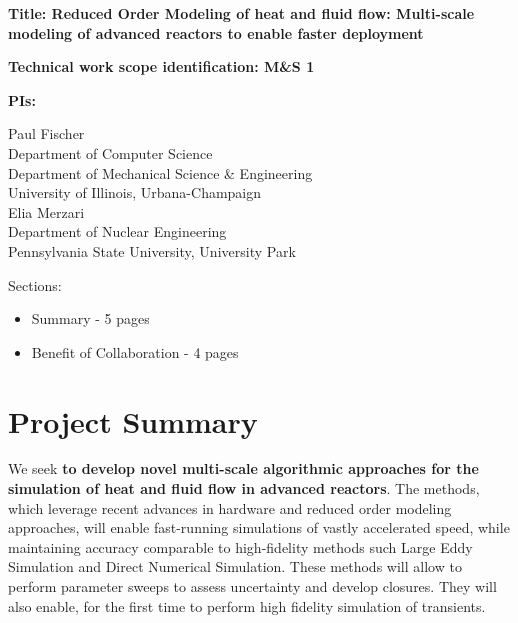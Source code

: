 
\parindent 0in
\parskip 0.1in

{\bf Title:  Reduced Order Modeling of heat and fluid flow: Multi-scale modeling of advanced reactors to enable faster deployment }

{\bf Technical work scope identification: M\&S 1 }

{\bf PIs:}

Paul Fischer \\
Department of Computer Science \\
Department of Mechanical Science \& Engineering \\
University of Illinois, Urbana-Champaign \\

Elia Merzari \\
Department of Nuclear Engineering \\
Pennsylvania State University, University Park

Sections:
\begin{itemize}
\item{Summary - 5 pages}
\item{Benefit of Collaboration - 4 pages}
\end{itemize}



\section{Project Summary}


We seek \textbf{to develop novel multi-scale algorithmic approaches for the simulation of heat and fluid flow in advanced reactors}. The methods, which leverage recent advances in hardware and reduced order modeling approaches, will enable fast-running simulations of vastly accelerated speed, while maintaining accuracy comparable to high-fidelity methods such Large Eddy Simulation and Direct Numerical Simulation. These methods will allow to perform parameter sweeps to assess uncertainty and develop closures. They will also enable, for the first time to perform high fidelity simulation of transients.

